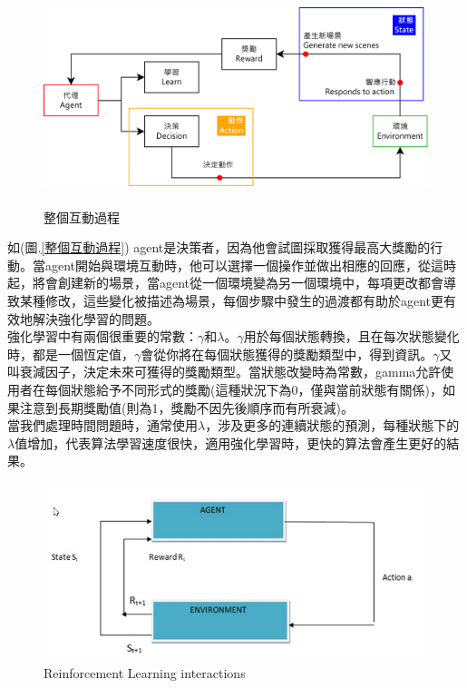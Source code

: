 \documentclass[14pt,a4paper]{report}  %
\begin{document}
\begin{figure}[hbt!]
\begin{center}
\includegraphics[height=6.3cm]{The_entire_interaction_process}
\caption{\Large 整個互動過程 }
\label{整個互動過程 }
\end{center}
\end{figure}
 如(圖.\ref{整個互動過程}) agent是決策者，因為他會試圖採取獲得最高大獎勵的行動。當agent開始與環境互動時，他可以選擇一個操作並做出相應的回應，從這時起，將會創建新的場景，當agent從一個環境變為另一個環境中，每項更改都會導致某種修改，這些變化被描述為場景，每個步驟中發生的過渡都有助於agent更有效地解決強化學習的問題。\\
 強化學習中有兩個很重要的常數：$\gamma$和$\lambda$。$\gamma$用於每個狀態轉換，且在每次狀態變化時，都是一個恆定值，$\gamma$會從你將在每個狀態獲得的獎勵類型中，得到資訊。$\gamma$又叫衰減因子，決定未來可獲得的獎勵類型。當狀態改變時為常數，gamma允許使用者在每個狀態給予不同形式的獎勵(這種狀況下為0，僅與當前狀態有關係)，如果注意到長期獎勵值(則為1，獎勵不因先後順序而有所衰減)。\\
 當我們處理時間問題時，通常使用$\lambda$，涉及更多的連續狀態的預測，每種狀態下的$\lambda$值增加，代表算法學習速度很快，適用強化學習時，更快的算法會產生更好的結果。\\
\iffalse
\begin{figure}[hbt!]
\begin{center}
\includegraphics[scale=0.74]{ Reinforcement_Learning_interactions}
\caption{\Large Reinforcement Learning interactions}
\end{center}
\end{figure}
\end{document}

